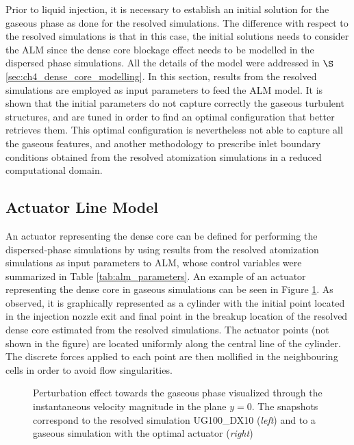 Prior to liquid injection, it is necessary to establish an initial solution for the gaseous phase as done for the resolved simulations. The difference with respect to the resolved simulations is that in this case, the initial solutions needs to consider the ALM since the dense core blockage effect needs to be modelled in the dispersed phase simulations. All the details of the model were addressed in $\S$\ref{sec:ch4_dense_core_modelling}. In this section, results from the resolved simulations are employed as input parameters to feed the ALM model. It is shown that the initial parameters do not capture correctly the gaseous turbulent structures, and are tuned in order to find an optimal configuration that better retrieves them. This optimal configuration is nevertheless not able to capture all the gaseous features, and another methodology to prescribe inlet boundary conditions obtained from the resolved atomization simulations in a reduced computational domain.


\subsection{Actuator Line Model}


An actuator representing the dense core can be defined for performing the dispersed-phase simulations by using results from the resolved atomization simulations as input parameters to ALM, whose control variables were summarized in Table \ref{tab:alm_parameters}. An example of an actuator representing the dense core in gaseous simulations can be seen in Figure \ref{fig:u_inst_SPS_and_ALM}. As observed, it is graphically represented as a cylinder with the initial point located in the injection nozzle exit and final point in the breakup location of the resolved dense core estimated from the resolved simulations. The actuator points (not shown in the figure) are located uniformly along the central line of the cylinder. The discrete forces applied to each point are then mollified in the neighbouring cells in order to avoid flow singularities.


\begin{figure}[h!]
	\centering	{}
	\caption[Perturbation effect towards the gaseous phase visualized through the instantaneous velocity magnitude in the plane $y = 0$]{Perturbation effect towards the gaseous phase visualized through the instantaneous velocity magnitude in the plane $y = 0$. The snapshots correspond to the resolved simulation UG100\_DX10 (\textsl{left}) and to a gaseous simulation with the optimal actuator (\textsl{right})}	
	\label{fig:u_inst_SPS_and_ALM}
\end{figure}


